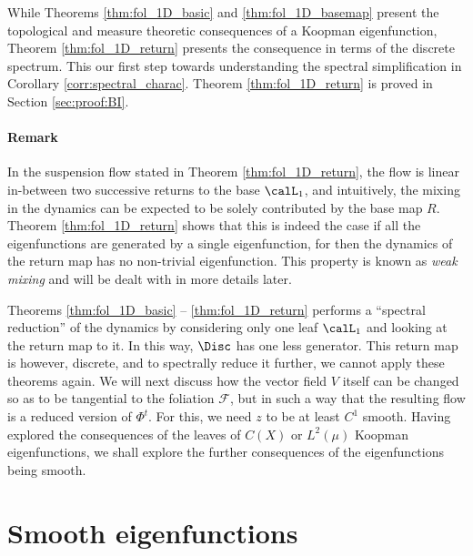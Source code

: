 \documentclass[12pt,oneside]{article}
\newcommand{\Fol}{\mathcal{F}}
\newcommand{\Return}{R}
\begin{document}
While Theorems \ref{thm:fol_1D_basic} and \ref{thm:fol_1D_basemap} present the topological and measure theoretic consequences of a Koopman eigenfunction, Theorem \ref{thm:fol_1D_return} presents the consequence in terms of the discrete spectrum.  This our first step towards understanding the spectral simplification in Corollary \ref{corr:spectral_charac}. Theorem \ref{thm:fol_1D_return} is proved in Section \ref{sec:proof:BI}. 

\paragraph{Remark} In the suspension flow stated in Theorem \ref{thm:fol_1D_return}, the flow is linear in-between two successive returns to the base $\calL_1$, and intuitively, the mixing in the dynamics can be expected to be solely contributed by the base map $\Return$. Theorem \ref{thm:fol_1D_return} shows that this is indeed the case if all the eigenfunctions are generated by a single eigenfunction, for then the dynamics of the return map has no non-trivial eigenfunction. This property is known as \emph{weak mixing} and will be dealt with in more details later. %

Theorems \ref{thm:fol_1D_basic} -- \ref{thm:fol_1D_return} performs a ``spectral reduction'' of the dynamics by considering only one leaf $\calL_1$ and looking at the return map to it. In this way, $\Disc$ has one less generator. This return map is however, discrete, and to spectrally reduce it further, we cannot apply these theorems again. We will next discuss how the vector field $V$ itself can be changed so as to be tangential to the foliation $\Fol$, but in such a way that the resulting flow is a reduced version of $\Phi^t$. For this, we need $z$ to be at least $C^1$ smooth. Having explored the consequences of the leaves of $C(X)$ or $L^2(\mu)$ Koopman eigenfunctions, we shall explore the further consequences of the eigenfunctions being smooth. 

\section{Smooth eigenfunctions} \label{sec:smooth_eig}
\end{document}
